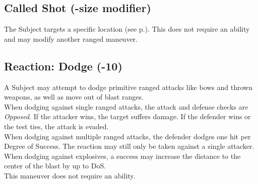 \subsection*{Called Shot (-size modifier)}
The Subject targets a specific location (see p.\pageref{sizestable}).
This does not require an ability and may modify another ranged maneuver.
\subsection*{Reaction: Dodge (-10)}
A Subject may attempt to dodge primitive ranged attacks like bows and thrown weapons, as well as move out of blast ranges.\\
When dodging against single ranged attacks, the attack and defense checks are \emph{Opposed}.
If the attacker wins, the target suffers damage.
If the defender wins or the test ties, the attack is evaded.
\\%
When dodging against multiple ranged attacks, the defender dodges one hit per Degree of Success.
The reaction may still only be taken against a single attacker.
\\%
When dodging against explosives, a success may increase the distance to the center of the blast by up to DoS.\\
This maneuver does not require an ability.
